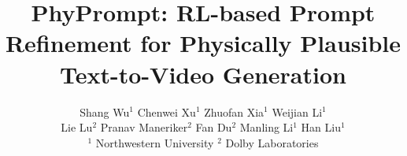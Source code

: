\documentclass[10pt,twocolumn,letterpaper]{article}
\title{PhyPrompt: RL-based Prompt Refinement for Physically Plausible Text-to-Video Generation}
\author{
Shang Wu$^{1}$ \quad Chenwei Xu$^{1}$ \quad Zhuofan Xia$^{1}$ \quad Weijian Li$^{1}$ \\
Lie Lu$^{2}$ \quad Pranav Maneriker$^{2}$ \quad Fan Du$^{2}$ \quad Manling Li$^{1}$ \quad Han Liu$^{1}$\\
{\small $^{1}$ Northwestern University \quad $^{2}$ Dolby Laboratories}
}
\begin{document}
\maketitle




% 



{
    \small
    
    
}


\end{document}
